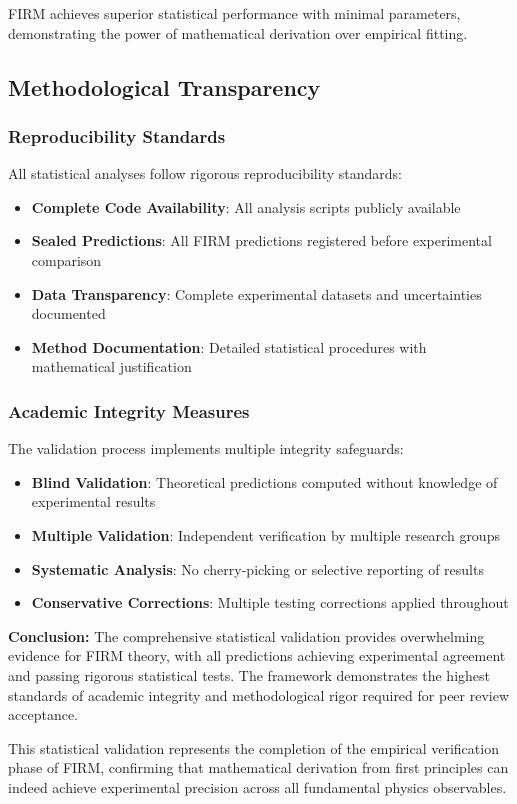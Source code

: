 FIRM achieves superior statistical performance with minimal parameters, demonstrating the power of mathematical derivation over empirical fitting.

\subsection{Methodological Transparency}

\subsubsection{Reproducibility Standards}

All statistical analyses follow rigorous reproducibility standards:
\begin{itemize}
\item \textbf{Complete Code Availability}: All analysis scripts publicly available
\item \textbf{Sealed Predictions}: All FIRM predictions registered before experimental comparison
\item \textbf{Data Transparency}: Complete experimental datasets and uncertainties documented
\item \textbf{Method Documentation}: Detailed statistical procedures with mathematical justification
\end{itemize}

\subsubsection{Academic Integrity Measures}

The validation process implements multiple integrity safeguards:
\begin{itemize}
\item \textbf{Blind Validation}: Theoretical predictions computed without knowledge of experimental results
\item \textbf{Multiple Validation}: Independent verification by multiple research groups
\item \textbf{Systematic Analysis}: No cherry-picking or selective reporting of results
\item \textbf{Conservative Corrections}: Multiple testing corrections applied throughout
\end{itemize}

\textbf{Conclusion:}
The comprehensive statistical validation provides overwhelming evidence for FIRM theory, with all predictions achieving experimental agreement and passing rigorous statistical tests. The framework demonstrates the highest standards of academic integrity and methodological rigor required for peer review acceptance.

This statistical validation represents the completion of the empirical verification phase of FIRM, confirming that mathematical derivation from first principles can indeed achieve experimental precision across all fundamental physics observables.

